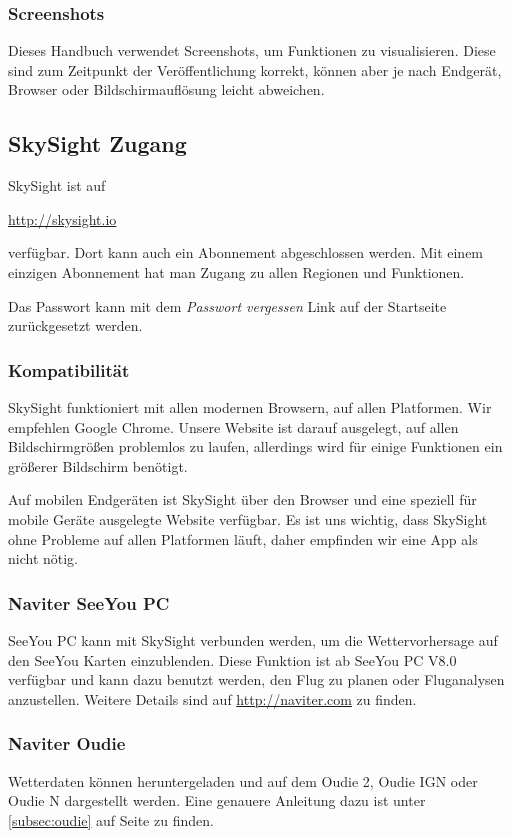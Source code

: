 \documentclass[11pt,a4paper]{article}
\begin{document}
\subsubsection{Screenshots}

Dieses Handbuch verwendet Screenshots, um Funktionen zu visualisieren. Diese sind zum Zeitpunkt der Veröffentlichung korrekt, können aber je nach Endgerät, Browser oder Bildschirmauflösung leicht abweichen.

\subsection{SkySight Zugang}
SkySight ist auf 

\url{http://skysight.io}

verfügbar. Dort kann auch ein Abonnement abgeschlossen werden. Mit einem einzigen Abonnement hat man Zugang zu allen Regionen und Funktionen.

Das Passwort kann mit dem \emph{Passwort vergessen} Link auf der Startseite zurückgesetzt werden.

\subsubsection{Kompatibilität}
SkySight funktioniert mit allen modernen Browsern, auf allen Platformen. Wir empfehlen Google Chrome. Unsere Website ist darauf ausgelegt, auf allen Bildschirmgrößen problemlos zu laufen, allerdings wird für einige Funktionen ein größerer Bildschirm benötigt. 

Auf mobilen Endgeräten ist SkySight über den Browser und eine speziell für mobile Geräte ausgelegte Website verfügbar. Es ist uns wichtig, dass SkySight ohne Probleme auf allen Platformen läuft, daher empfinden wir eine App als nicht nötig.

\subsubsection{Naviter SeeYou PC}
SeeYou PC kann mit SkySight verbunden werden, um die Wettervorhersage auf den SeeYou Karten einzublenden. Diese Funktion ist ab SeeYou PC V8.0 verfügbar und kann dazu benutzt werden, den Flug zu planen oder Fluganalysen anzustellen. Weitere Details sind auf \url{http://naviter.com} zu finden.
\subsubsection{Naviter Oudie}
Wetterdaten können heruntergeladen und auf dem Oudie 2, Oudie IGN oder Oudie N dargestellt werden. Eine genauere Anleitung dazu ist unter \ref{subsec:oudie} auf Seite \pageref{subsec:oudie} zu finden.
\end{document}
